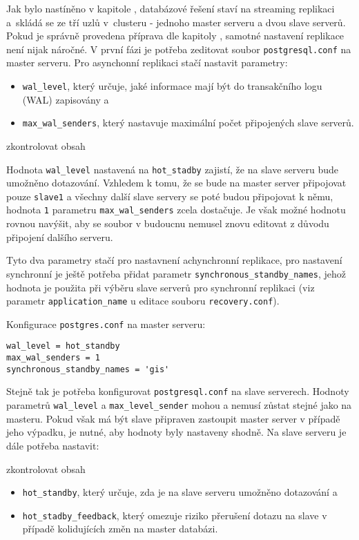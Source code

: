 
Jak bylo nastíněno v kapitole , databázové řešení staví na
streaming replikaci a~skládá se ze tří uzlů v~clusteru - jednoho master serveru a
dvou slave serverů. Pokud je správně provedena příprava dle kapitoly
, samotné nastavení replikace není nijak náročné. V
první fázi je potřeba zeditovat soubor \texttt{postgresql.conf} na master
serveru. Pro asynchonní replikaci stačí nastavit parametry:
\begin{itemize}
  \item \texttt{wal\_level}, který určuje, jaké informace mají být do transakčního
    logu (WAL) zapisovány a
  \item \texttt{max\_wal\_senders}, který nastavuje maximální počet připojených
    slave serverů.
\end{itemize}

\begin{framed}
  zkontrolovat obsah
\end{framed}

Hodnota \texttt{wal\_level} nastavená na \texttt{hot\_stadby} zajistí, že na
slave serveru bude umožněno dotazování. Vzhledem k tomu, že se bude na master
server připojovat pouze \texttt{slave1} a všechny další slave servery se poté
budou připojovat k němu, hodnota \texttt{1} parametru \texttt{max\_wal\_senders}
zcela dostačuje. Je však možné hodnotu rovnou navýšit, aby se soubor v budoucnu
nemusel znovu editovat z důvodu připojení dalšího serveru.

Tyto dva parametry stačí pro nastavnení achynchronní replikace, pro nastavení
synchronní je ještě potřeba přidat parametr
\texttt{synchronous\_standby\_names}, jehož hodnota je použita při výběru slave
serverů pro synchronní replikaci (viz parametr \texttt{application\_name} u
editace souboru \texttt{recovery.conf}).

Konfigurace \texttt{postgres.conf} na master serveru:
\begin{lstlisting}
wal_level = hot_standby
max_wal_senders = 1
synchronous_standby_names = 'gis'
\end{lstlisting}

Stejně tak je potřeba konfigurovat \texttt{postgresql.conf} na slave serverech.
Hodnoty parametrů \texttt{wal\_level} a \texttt{max\_level\_sender} mohou a
nemusí zůstat stejné jako na masteru. Pokud však má být slave připraven
zastoupit master server v případě jeho výpadku, je nutné, aby hodnoty byly
nastaveny shodně.  Na slave serveru je dále potřeba nastavit:
\begin{framed}
  zkontrolovat obsah
\end{framed}
\begin{itemize}
  \item\texttt{hot\_standby}, který určuje, zda je na slave serveru umožněno
    dotazování a
  \item\texttt{hot\_stadby\_feedback}, který omezuje riziko přerušení
    dotazu na slave v případě kolidujících změn na master databázi.
\end{itemize}

